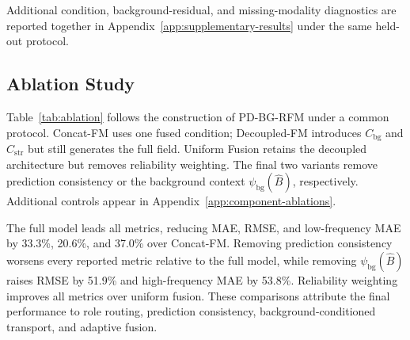Additional condition, background-residual, and missing-modality diagnostics are reported together in Appendix~\ref{app:supplementary-results} under the same held-out protocol.

\subsection{Ablation Study}

Table~\ref{tab:ablation} follows the construction of PD-BG-RFM under a common protocol. Concat-FM uses one fused condition; Decoupled-FM introduces $C_{\mathrm{bg}}$ and $C_{\mathrm{str}}$ but still generates the full field. Uniform Fusion retains the decoupled architecture but removes reliability weighting. The final two variants remove prediction consistency or the background context $\psi_{\mathrm{bg}}(\hat B)$, respectively. Additional controls appear in Appendix~\ref{app:component-ablations}.


The full model leads all metrics, reducing MAE, RMSE, and low-frequency MAE by 33.3\%, 20.6\%, and 37.0\% over Concat-FM. Removing prediction consistency worsens every reported metric relative to the full model, while removing $\psi_{\mathrm{bg}}(\hat B)$ raises RMSE by 51.9\% and high-frequency MAE by 53.8\%. Reliability weighting improves all metrics over uniform fusion. These comparisons attribute the final performance to role routing, prediction consistency, background-conditioned transport, and adaptive fusion.

